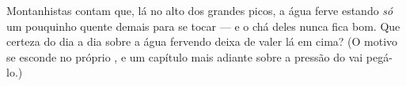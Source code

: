 \begin{exercise}[$\star\star$]\label{exo:g4:changes-of-state:11}
Montanhistas contam que, lá no alto dos grandes picos, a água ferve
estando \emph{só} um pouquinho quente demais para se tocar --- e o
chá deles nunca fica bom. Que certeza do dia a dia sobre a água
fervendo deixa de valer lá em cima? (O motivo se esconde no próprio
, e um capítulo mais adiante sobre a pressão do  vai pegá-lo.)
\end{exercise}
